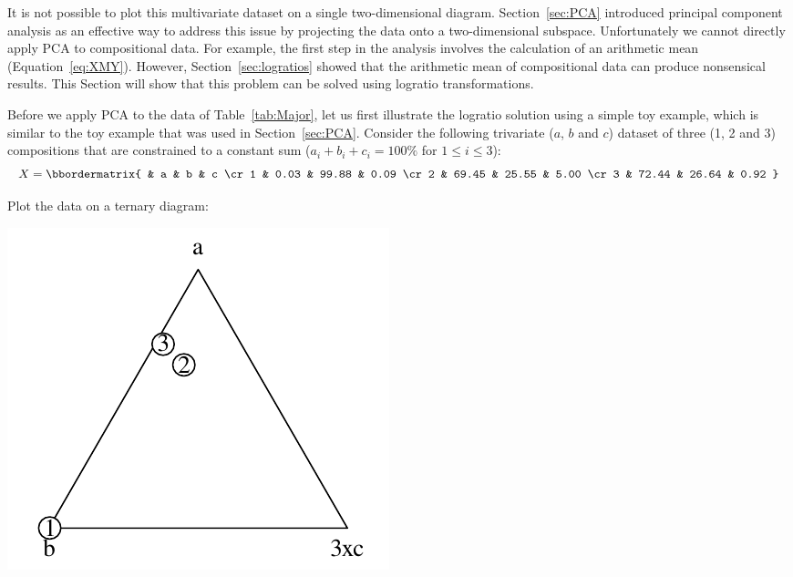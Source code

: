 It is not possible to plot this multivariate dataset on a single
two-dimensional diagram. Section~\ref{sec:PCA} introduced principal
component analysis as an effective way to address this issue by
projecting the data onto a two-dimensional subspace. Unfortunately we
cannot directly apply PCA to compositional data. For example, the
first step in the analysis involves the calculation of an arithmetic
mean (Equation~\ref{eq:XMY}). However, Section~\ref{sec:logratios}
showed that the arithmetic mean of compositional data can produce
nonsensical results. This Section will show that this problem can be
solved using logratio transformations.\medskip

Before we apply PCA to the data of Table~\ref{tab:Major}, let us first
illustrate the logratio solution using a simple toy example, which is
similar to the toy example that was used in
Section~\ref{sec:PCA}. Consider the following trivariate ($a$, $b$ and
$c$) dataset of three (1, 2 and 3) compositions that are constrained
to a constant sum ($a_i+b_i+c_i=100\%$ for $1\leq{i}\leq{3}$):
\begin{equation}
  X =
  \bbordermatrix{ & a & b & c \cr
   1 & 0.03 & 99.88 & 0.09 \cr
   2 & 69.45 & 25.55 & 5.00 \cr
   3 & 72.44 & 26.64 & 0.92
  }
  \label{eq:Xcomp}
\end{equation}

Plot the data on a ternary diagram:

\noindent\begin{minipage}[t][][b]{.3\textwidth}
\includegraphics[width=\textwidth]{../figures/abc.pdf}\medskip
\end{minipage}
\begin{minipage}[t][][t]{.7\textwidth}
  \label{fig:abc}
\end{minipage}


